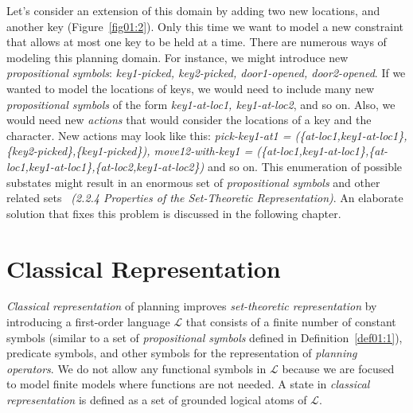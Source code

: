 \begin{example}\label{ex01:2}
    Let's consider an extension of this domain by adding two new locations, and another key (Figure~\ref{fig01:2}). Only this time we want to model a new constraint that allows at most one key to be held at a time. There are numerous ways of modeling this planning domain. For instance, we might introduce new \emph{propositional symbols}: \emph{key1-picked, key2-picked, door1-opened, door2-opened}. If we wanted to model the locations of keys, we would need to include many new \emph{propositional symbols} of the form \emph{key1-at-loc1, key1-at-loc2}, and so on. Also, we would need new \emph{actions} that would consider the locations of a key and the character. New actions may look like this: \emph{pick-key1-at1 = (\{at-loc1,key1-at-loc1\},\{key2-picked\},\{key1-picked\}), move12-with-key1 = (\{at-loc1,key1-at-loc1\},\{at-loc1,key1-at-loc1\},\{at-loc2,key1-at-loc2\})} and so on. This enumeration of possible substates might result in an enormous set of \emph{propositional symbols} and other related sets \emph{\cite{nau}~{(2.2.4 Properties of the Set-Theoretic Representation)}}. An elaborate solution that fixes this problem is discussed in the following chapter.
\end{example}

\section{Classical Representation}\label{class_repre}

\noindent
\emph{Classical representation} of planning improves \emph{set-theoretic representation} by introducing a first-order language $\mathcal{L}$ that consists of a finite number of constant symbols (similar to a set of \emph{propositional symbols} defined in Definition~\ref{def01:1}), predicate symbols, and other symbols for the representation of \emph{planning operators}. We do not allow any functional symbols in $\mathcal{L}$ because we are focused to model finite models where functions are not needed. A state in \emph{classical representation} is defined as a set of grounded logical atoms of $\mathcal{L}$.

